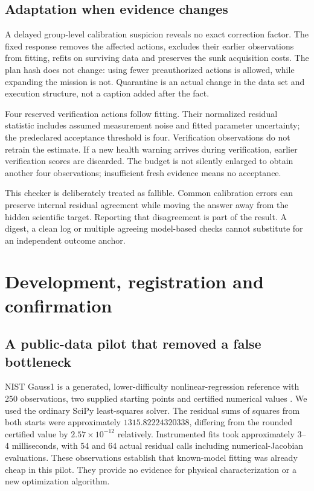 \documentclass[11pt,letterpaper]{article}
\begin{document}
\subsection{Adaptation when evidence changes}

A delayed group-level calibration suspicion reveals no exact correction factor. The fixed response removes the affected actions, excludes their earlier observations from fitting, refits on surviving data and preserves the sunk acquisition costs. The plan hash does not change: using fewer preauthorized actions is allowed, while expanding the mission is not. Quarantine is an actual change in the data set and execution structure, not a caption added after the fact.

Four reserved verification actions follow fitting. Their normalized residual statistic includes assumed measurement noise and fitted parameter uncertainty; the predeclared acceptance threshold is four. Verification observations do not retrain the estimate. If a new health warning arrives during verification, earlier verification scores are discarded. The budget is not silently enlarged to obtain another four observations; insufficient fresh evidence means no acceptance.

This checker is deliberately treated as fallible. Common calibration errors can preserve internal residual agreement while moving the answer away from the hidden scientific target. Reporting that disagreement is part of the result. A digest, a clean log or multiple agreeing model-based checks cannot substitute for an independent outcome anchor.

\section{Development, registration and confirmation}

\subsection{A public-data pilot that removed a false bottleneck}

NIST Gauss1 is a generated, lower-difficulty nonlinear-regression reference with 250 observations, two supplied starting points and certified numerical values \citep{nist1996gauss1}. We used the ordinary SciPy least-squares solver. The residual sums of squares from both starts were approximately $1315.82224320338$, differing from the rounded certified value by $2.57\times10^{-12}$ relatively. Instrumented fits took approximately 3--4 milliseconds, with 54 and 64 actual residual calls including numerical-Jacobian evaluations. These observations establish that known-model fitting was already cheap in this pilot. They provide no evidence for physical characterization or a new optimization algorithm.
\end{document}
